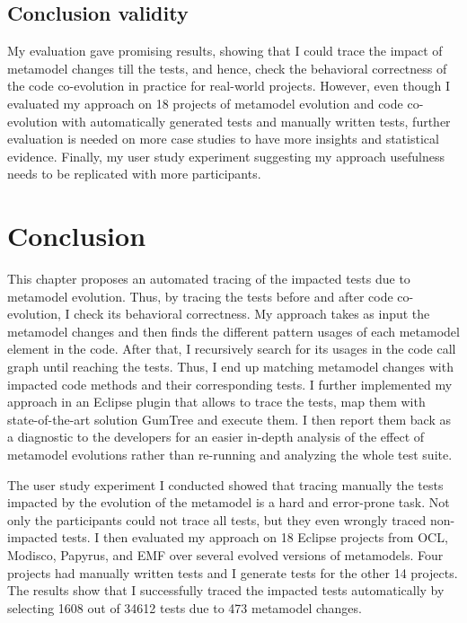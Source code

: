 \subsection{Conclusion validity}
My evaluation gave promising results, showing that I could trace the impact of metamodel changes till the tests, and hence, check the behavioral correctness of the code co-evolution in practice for real-world projects. 
However, even though I evaluated my approach on 18 projects of metamodel evolution and code co-evolution with automatically generated tests and manually written tests, further evaluation is needed on more case studies to have more insights and statistical evidence. Finally, my user study experiment suggesting my approach usefulness needs to be replicated with more participants.

\section{Conclusion}
\label{sec_conclusion}
This chapter proposes an automated tracing of the impacted tests due to metamodel evolution. Thus, by tracing the tests before and after code co-evolution, I check its behavioral correctness. 
My approach takes as input the metamodel changes and then finds the different pattern usages of each metamodel element in the code. 
After that, I recursively search for its usages in the code call graph until reaching the tests. Thus, I end up matching metamodel changes with impacted code methods and their corresponding tests. 
%
I further implemented my approach in an Eclipse plugin that allows to trace the tests, map them with state-of-the-art solution GumTree and execute them. I then report them back as a diagnostic to the developers for an easier in-depth analysis of the effect of metamodel evolutions rather than re-running and analyzing the whole test suite.

The user study experiment I conducted showed that tracing manually the tests impacted by the evolution of the metamodel is a hard and error-prone task. Not only the participants could not trace all tests, but they even wrongly traced non-impacted tests.  
	I then evaluated my approach on 18 Eclipse projects from OCL, Modisco, Papyrus, and EMF over several evolved versions of metamodels. Four projects had manually written tests and I generate tests for the other 14 projects. 
	The results show that I successfully traced the impacted tests automatically by selecting 1608 out of 34612 tests due to 473 metamodel changes. 
	
